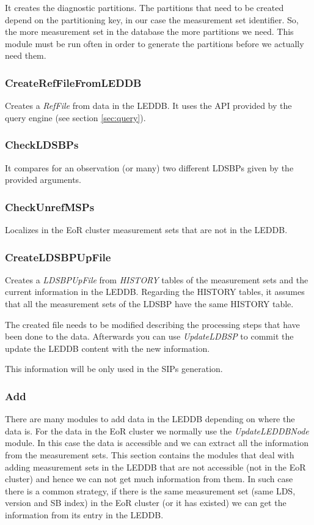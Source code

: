 \documentclass[a4paper,11pt]{article}
\begin{document}
It creates the diagnostic partitions. The partitions that need to be created depend on the partitioning key, in our case the measurement set identifier. So, the more measurement set in the database the more partitions we need. This module must be run often in order to generate the partitions before we actually need them.

\subsubsection*{CreateRefFileFromLEDDB}

Creates a \textit{RefFile} from data in the LEDDB. It uses the API provided by the query engine (see section \ref{sec:query}).

\subsubsection*{CheckLDSBPs}

It compares for an observation (or many) two different LDSBPs given by the provided arguments.

\subsubsection*{CheckUnrefMSPs}

Localizes in the EoR cluster measurement sets that are not in the LEDDB.

\subsubsection*{CreateLDSBPUpFile}

Creates a \textit{LDSBPUpFile} from \textit{HISTORY} tables of the measurement sets and the current information in the LEDDB. Regarding the HISTORY tables, it assumes that all the measurement sets of the LDSBP have the same HISTORY table.

The created file needs to be modified describing the processing steps that have been done to the data. Afterwards you can use \textit{UpdateLDBSP} to commit the update the LEDDB content with the new information. 

This information will be only used in the SIPs generation.

\subsubsection{Add}

There are many modules to add data in the LEDDB depending on where the data is. For the data in the EoR cluster we normally use the \textit{UpdateLEDDBNode} module. In this case the data is accessible and we can extract all the information from the measurement sets. This section contains the modules that deal with adding measurement sets in the LEDDB that are not accessible (not in the EoR cluster) and hence we can not get much information from them.
In such case there is a common strategy, if there is the same measurement set (same LDS, version and SB index) in the EoR cluster (or it has existed) we can get the information from its entry in the LEDDB.
\end{document}

